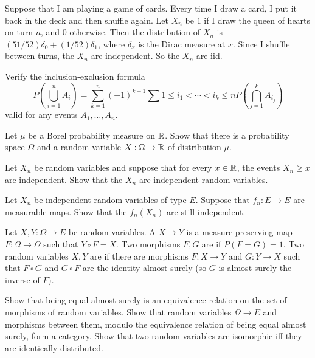 \begin{example}
Suppose that I am playing a game of cards.
Every time I draw a card, I put it back in the deck and then shuffle again.
Let $X_n$ be $1$ if I draw the queen of hearts on turn $n$, and $0$ otherwise.
Then the distribution of $X_n$ is $(51/52)\delta_0 + (1/52)\delta_1$, where $\delta_x$ is the Dirac measure at $x$.
Since I shuffle between turns, the $X_n$ are independent.
So the $X_n$ are iid.
\end{example}

\begin{exercise}
Verify the inclusion-exclusion formula
$$P\left(\bigcup_{i=1}^n A_i\right) = \sum_{k=1}^n (-1)^{k+1} \sum{1 \leq i_1 < \cdots < i_k \leq n} P\left(\bigcap_{j=1}^k A_{i_j}\right)$$
valid for any events $A_1, \dots, A_n$.
\end{exercise}

\begin{exercise}
\label{Skohorod representation}
Let $\mu$ be a Borel probability measure on $\mathbb{R}$.
Show that there is a probability space $\Omega$ and a random variable $X: \Omega \to \mathbb{R}$ of distribution $\mu$.
\end{exercise}

\begin{exercise}
Let $X_n$ be random variables and suppose that for every $x \in \mathbb{R}$, the events $X_n \geq x$ are independent.
Show that the $X_n$ are independent random variables.
\end{exercise}

\begin{exercise}
Let $X_n$ be independent random variables of type $E$.
Suppose that $f_n: E \to E$ are measurable maps.
Show that the $f_n(X_n)$ are still independent.
\end{exercise}

\begin{exercise}
Let $X, Y: \Omega \to E$ be random variables.
A  $X \to Y$ is a measure-preserving map $F: \Omega \to \Omega$ such that $Y \circ F = X$.
Two morphisms $F,G$ are  if $P(F = G) = 1$.
Two random variables $X,Y$ are  if there are morphisms $F: X \to Y$ and $G: Y \to X$ such that $F \circ G$ and $G \circ F$ are the identity almost surely (so $G$ is almost surely the inverse of $F$).

Show that being equal almost surely is an equivalence relation on the set of morphisms of random variables.
Show that random variables $\Omega \to E$ and morphisms between them, modulo the equivalence relation of being equal almost surely, form a category.
Show that two random variables are isomorphic iff they are identically distributed.
\end{exercise}

